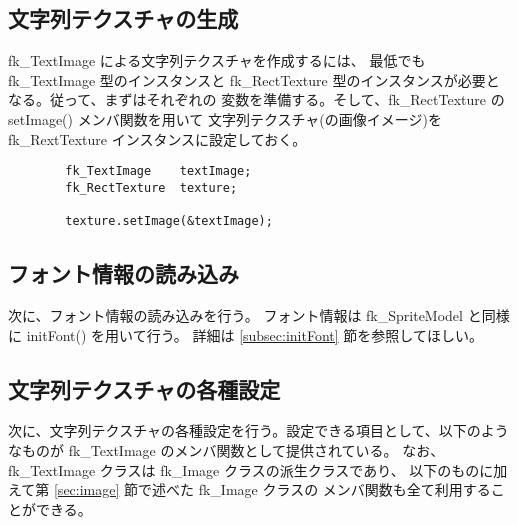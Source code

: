 \subsection{文字列テクスチャの生成}
fk\_TextImage による文字列テクスチャを作成するには、
最低でも fk\_TextImage 型のインスタンスと
fk\_RectTexture 型のインスタンスが必要となる。従って、まずはそれぞれの
変数を準備する。そして、fk\_RectTexture の setImage() メンバ関数を用いて
文字列テクスチャ(の画像イメージ)を fk\_RextTexture インスタンスに設定しておく。
\\
\begin{screen}
\begin{verbatim}
        fk_TextImage    textImage;
        fk_RectTexture  texture;

        texture.setImage(&textImage);
\end{verbatim}
\end{screen}

\subsection{フォント情報の読み込み}
次に、フォント情報の読み込みを行う。
フォント情報は fk\_SpriteModel と同様に initFont() を用いて行う。
詳細は \ref{subsec:initFont} 節を参照してほしい。

\subsection{文字列テクスチャの各種設定}
次に、文字列テクスチャの各種設定を行う。設定できる項目として、以下のようなものが
fk\_TextImage のメンバ関数として提供されている。
なお、fk\_TextImage クラスは fk\_Image クラスの派生クラスであり、
以下のものに加えて第 \ref{sec:image} 節で述べた fk\_Image クラスの
メンバ関数も全て利用することができる。

